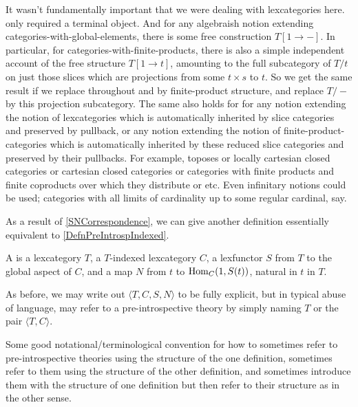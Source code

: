 \begin{remark}
It wasn't fundamentally important that we were dealing with lexcategories here.  only required a terminal object. And for any algebraish notion extending categories-with-global-elements, there is some free construction $T[1 \to -]$. In particular, for categories-with-finite-products, there is also a simple independent account of the free structure $T[1 \to t]$, amounting to the full subcategory of $T/t$ on just those slices which are projections from some $t \times s$ to $t$. So we get the same result if we replace throughout  and  by finite-product structure, and replace $T/-$ by this projection subcategory. The same also holds for for any notion extending the notion of lexcategories which is automatically inherited by slice categories and preserved by pullback, or any notion extending the notion of finite-product-categories which is automatically inherited by these reduced slice categories and preserved by their pullbacks. For example, toposes or locally cartesian closed categories or cartesian closed categories or categories with finite products and finite coproducts over which they distribute or etc. Even infinitary notions could be used; categories with all limits of cardinality up to some regular cardinal, say.
\end{remark}

As a result of \cref{SNCorrespondence}, we can give another definition essentially equivalent to \cref{DefnPreIntrospIndexed}.

\begin{definition}\label{DefnPreIntrospSN}
A  is a lexcategory $T$, a $T$-indexed lexcategory $C$, a lexfunctor $S$ from $T$ to the global aspect of $C$, and a map $N$ from $t$ to $\operatorname{Hom}_C(1, S(t))$, natural in $t$ in $T$.
\end{definition}

As before, we may write out $\langle T, C, S, N \rangle$ to be fully explicit, but in typical abuse of language, may refer to a pre-introspective theory by simply naming $T$ or the pair $\langle T, C\rangle$.

\begin{TODOblock}
Some good notational/terminological convention for how to sometimes refer to pre-introspective theories using the structure of the one definition, sometimes refer to them using the structure of the other definition, and sometimes introduce them with the structure of one definition but then refer to their structure as in the other sense.
\end{TODOblock}

